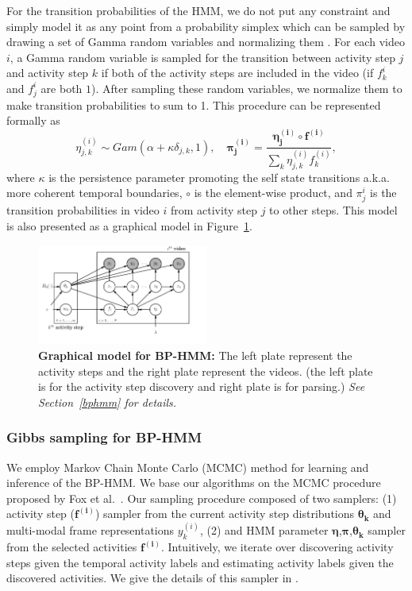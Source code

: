 For the transition probabilities of the HMM, we do not put any constraint and simply model it as any point from a probability simplex which can be sampled by drawing a set of Gamma random variables and normalizing them \cite{foxBPHMM}. For each video $i$, a Gamma random variable is sampled for the transition between activity step $j$ and activity step $k$ if both of the activity steps are included in the video (\ie if $f^i_k$ and $f^i_j$ are both $1$). After sampling these random variables, we normalize them to make transition probabilities to sum to 1. This procedure can be represented formally as
\begin{equation}
  \eta_{j,k}^{(i)} \sim Gam(\alpha+\kappa \delta_{j,k},1), \quad \mathbf{\pi_j^{(i)}} = \frac{\mathbf{\eta^{(i)}_j} \circ \mathbf{f^{(i)}}}{\sum_k \eta^{(i)}_{j,k} f^{(i)}_k},
\end{equation}
where $\kappa$ is the persistence parameter promoting the self state transitions a.k.a. more coherent temporal boundaries, $\circ$ is the element-wise product, and $\pi^i_j$ is the transition probabilities in video $i$ from activity step $j$ to other steps. This model is also presented as a graphical model in Figure~\ref{bphmmo}.
\begin{figure}[h!]
  \includegraphics[width=0.5\textwidth]{plate}
  \vspace{-9mm}
  \caption{\textbf{Graphical model for BP-HMM:} The left plate represent the activity steps and the right plate represent the videos. (\ie the left plate is for the activity step discovery and right plate is for parsing.) \emph{See Section~\ref{bphmm} for details.}}
  \vspace{-5mm}
  \label{bphmmo}
\end{figure}


\subsubsection{Gibbs sampling for BP-HMM}
We employ Markov Chain Monte Carlo (MCMC) method for learning and inference of the BP-HMM. We base our algorithms on the MCMC procedure proposed by Fox et al.~\cite{foxBPHMM}. Our sampling procedure composed of two samplers: (1) activity step ($\mathbf{f^{(i)}}$) sampler from the current activity step distributions $\mathbf{\theta_k}$ and multi-modal frame representations $y^{(i)}_k$, (2) and HMM parameter $\mathbf{\eta}$,$\mathbf{\pi}$,$\mathbf{\theta_k}$ sampler from the selected activities $\mathbf{f^{(i)}}$. Intuitively, we iterate over discovering activity steps given the temporal activity labels and estimating activity labels given the discovered activities. We give the details of this sampler in \cite{supp}.
